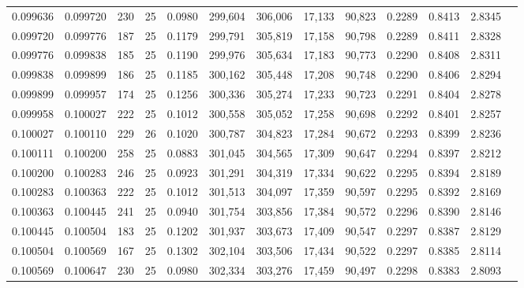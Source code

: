 \begin{tabular}{rrrrrrrrrrrrr}
0.099636 & 0.099720 &   230 &  25 &                                     0.0980 & 299,604 & 306,006 &  17,133 &  90,823 & 0.2289 & 0.8413 & 2.8345 \\
0.099720 & 0.099776 &   187 &  25 &                                     0.1179 & 299,791 & 305,819 &  17,158 &  90,798 & 0.2289 & 0.8411 & 2.8328 \\
0.099776 & 0.099838 &   185 &  25 &                                     0.1190 & 299,976 & 305,634 &  17,183 &  90,773 & 0.2290 & 0.8408 & 2.8311 \\
0.099838 & 0.099899 &   186 &  25 &                                     0.1185 & 300,162 & 305,448 &  17,208 &  90,748 & 0.2290 & 0.8406 & 2.8294 \\
0.099899 & 0.099957 &   174 &  25 &                                     0.1256 & 300,336 & 305,274 &  17,233 &  90,723 & 0.2291 & 0.8404 & 2.8278 \\
0.099958 & 0.100027 &   222 &  25 &                                     0.1012 & 300,558 & 305,052 &  17,258 &  90,698 & 0.2292 & 0.8401 & 2.8257 \\
0.100027 & 0.100110 &   229 &  26 &                                     0.1020 & 300,787 & 304,823 &  17,284 &  90,672 & 0.2293 & 0.8399 & 2.8236 \\
0.100111 & 0.100200 &   258 &  25 &                                     0.0883 & 301,045 & 304,565 &  17,309 &  90,647 & 0.2294 & 0.8397 & 2.8212 \\
0.100200 & 0.100283 &   246 &  25 &                                     0.0923 & 301,291 & 304,319 &  17,334 &  90,622 & 0.2295 & 0.8394 & 2.8189 \\
0.100283 & 0.100363 &   222 &  25 &                                     0.1012 & 301,513 & 304,097 &  17,359 &  90,597 & 0.2295 & 0.8392 & 2.8169 \\
0.100363 & 0.100445 &   241 &  25 &                                     0.0940 & 301,754 & 303,856 &  17,384 &  90,572 & 0.2296 & 0.8390 & 2.8146 \\
0.100445 & 0.100504 &   183 &  25 &                                     0.1202 & 301,937 & 303,673 &  17,409 &  90,547 & 0.2297 & 0.8387 & 2.8129 \\
0.100504 & 0.100569 &   167 &  25 &                                     0.1302 & 302,104 & 303,506 &  17,434 &  90,522 & 0.2297 & 0.8385 & 2.8114 \\
0.100569 & 0.100647 &   230 &  25 &                                     0.0980 & 302,334 & 303,276 &  17,459 &  90,497 & 0.2298 & 0.8383 & 2.8093 \\

\end{tabular}
